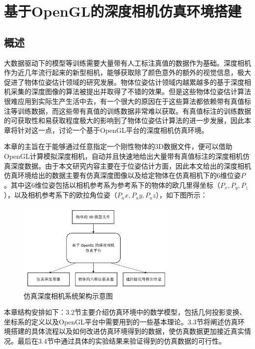 \chapter{基于OpenGL的深度相机仿真环境搭建}

\section{概述}
大数据驱动下的模型等训练需要大量带有人工标注真值的数据作为基础。深度相机作为近几年流行起来的新型相机，能够获取除了颜色意外的额外的视觉信息，极大促进了物体位姿估计领域的研究发展。物体位姿估计领域内越累越多的基于深度相机采集的深度图像的算法被提出并取得了不错的效果。但是这些物体位姿估计算法很难应用到实际生产生活中去，有一个很大的原因在于这些算法都依赖带有真值标注等训练数据，而这些带有真值的训练数据非常难以获取。有真值标注的训练数据的可获取性和易获取程度极大的影响到了物体位姿估计算法的进一步发展，因此本章将针对这一点，讨论一个基于OpenGL平台的深度相机仿真环境。

本章的主旨在于能够通过任意指定一个刚性物体的3D数据文件，便可以借助OpenGL计算模拟深度相机，自动并且快速地给出大量带有真值标注的深度相机仿真深度数据。由于本文研究内容主要在于位姿估计方面，因此本文给出的深度相机仿真环境给出的数据主要有仿真深度图像以及给定物体在仿真相机下的6维位姿$P$。其中这6维位姿包括以相机参考系为参考系下的物体的欧几里得坐标（$P_x,P_y,P_z$），以及相机参考系下的欧拉角位姿（$P_ax,P_ay,P_az$），如下图所示：

\begin{figure}[htb]
	\centering 
	\includegraphics[width=0.7\textwidth]{./mypic/仿真深度相机系统结构.jpg} 
	\caption{仿真深度相机系统架构示意图} 
\end{figure}

本章结构安排如下：3.2节主要介绍仿真环境中的数学模型，包括几何投影变换、坐标系的定义以及OpenGL平台中需要用到的一些基本理论。3.3节将阐述仿真环境搭建的具体流程以及如何改进仿真环境得到的数据，使仿真数据更加接近真实情况。最后在3.4节中通过具体的实验结果来验证得到的仿真数据的可行性。


